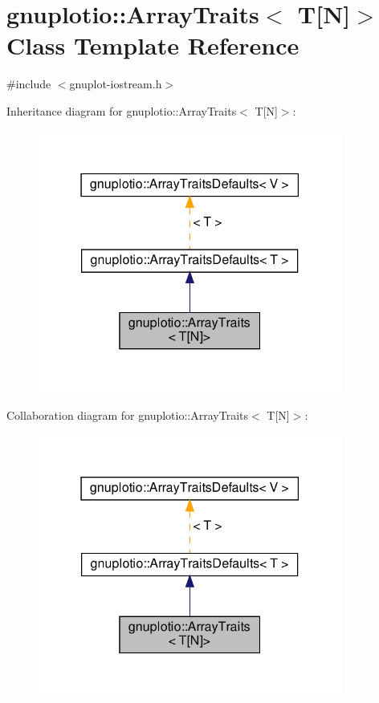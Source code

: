 \hypertarget{classgnuplotio_1_1_array_traits_3_01_t[_n]_4}{}\section{gnuplotio\+:\+:Array\+Traits$<$ T\mbox{[}N\mbox{]}$>$ Class Template Reference}
\label{classgnuplotio_1_1_array_traits_3_01_t[_n]_4}


{\ttfamily \#include $<$gnuplot-\/iostream.\+h$>$}



Inheritance diagram for gnuplotio\+:\+:Array\+Traits$<$ T\mbox{[}N\mbox{]}$>$\+:
\nopagebreak
\begin{figure}[H]
\begin{center}
\leavevmode
\includegraphics[width=283pt]{classgnuplotio_1_1_array_traits_3_01_t[_n]_4__inherit__graph}
\end{center}
\end{figure}


Collaboration diagram for gnuplotio\+:\+:Array\+Traits$<$ T\mbox{[}N\mbox{]}$>$\+:
\nopagebreak
\begin{figure}[H]
\begin{center}
\leavevmode
\includegraphics[width=283pt]{classgnuplotio_1_1_array_traits_3_01_t[_n]_4__coll__graph}
\end{center}
\end{figure}
